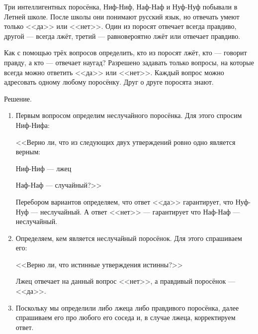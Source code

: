\documentclass[12pt,a4paper]{article}
\begin{document}
Три интеллигентных поросёнка, Ниф-Ниф, Наф-Наф и Нуф-Нуф побывали в Летней школе. После школы они понимают русский язык, но отвечать умеют только <<да>> или <<нет>>. Один из поросят отвечает всегда правдиво, другой --- всегда лжёт, третий --- равновероятно лжёт или отвечает правдиво.

Как с помощью трёх вопросов определить, кто из поросят лжёт, кто --- говорит правду, а кто --- отвечает наугад? Разрешено задавать только вопросы, на которые всегда можно ответить <<да>> или <<нет>>. Каждый вопрос можно адресовать одному любому поросёнку. Друг о друге поросята знают.


Решение.

\begin{enumerate}


\item Первым вопросом определим неслучайного поросёнка. Для этого спросим Ниф-Нифа:

<<Верно ли, что из следующих двух утверждений ровно одно является верным:

Ниф-Ниф --- лжец

Наф-Наф --- случайный?>>


Перебором вариантов определяем, что ответ <<да>> гарантирует, что Нуф-Нуф --- неслучайный. А ответ <<нет>> --- гарантирует что Наф-Наф --- неслучайный. 

\item Определяем, кем является неслучайный поросёнок. Для этого спрашиваем его:

<<Верно ли, что истинные утверждения истинны?>>

Лжец отвечает на данный вопрос <<нет>>, а правдивый поросёнок --- <<да>>.

\item Поскольку мы определили либо лжеца либо правдивого поросёнка, далее спрашиваем его про любого его соседа и, в случае лжеца, корректируем ответ.

\end{enumerate}
\end{document}
